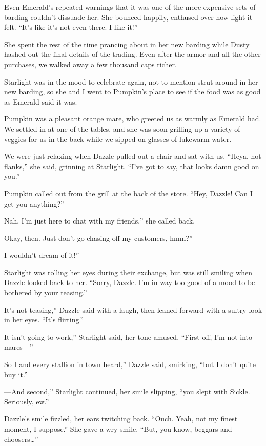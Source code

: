 Even Emerald’s repeated warnings that it was one of the more expensive sets of barding couldn’t dissuade her. She bounced happily, enthused over how light it felt. “It’s like it’s not even there. I like it!”

She spent the rest of the time prancing about in her new barding while Dusty hashed out the final details of the trading. Even after the armor and all the other purchases, we walked away a few thousand caps richer.

Starlight was in the mood to celebrate again, not to mention strut around in her new barding, so she and I went to Pumpkin’s place to see if the food was as good as Emerald said it was.

Pumpkin was a pleasant orange mare, who greeted us as warmly as Emerald had. We settled in at one of the tables, and she was soon grilling up a variety of veggies for us in the back while we sipped on glasses of lukewarm water.

We were just relaxing when Dazzle pulled out a chair and sat with us. “Heya, hot flanks,” she said, grinning at Starlight. “I’ve got to say, that looks damn good on you.”

Pumpkin called out from the grill at the back of the store. “Hey, Dazzle! Can I get you anything?”

\leavevmode{}Nah, I’m just here to chat with my friends,” she called back.

\leavevmode{}Okay, then. Just don’t go chasing off my customers, hmm?”

\leavevmode{}I wouldn’t dream of it!”

Starlight was rolling her eyes during their exchange, but was still smiling when Dazzle looked back to her. “Sorry, Dazzle. I’m in way too good of a mood to be bothered by your teasing.”

\leavevmode{}It’s not teasing,” Dazzle said with a laugh, then leaned forward with a sultry look in her eyes. “It’s flirting.”

\leavevmode{}It isn’t going to work,” Starlight said, her tone amused. “First off, I’m not into mares—”

\leavevmode{}So I and every stallion in town heard,” Dazzle said, smirking, “but I don’t quite buy it.”

\leavevmode{}—And second,” Starlight continued, her smile slipping, “you slept with Sickle. Seriously, ew.”

Dazzle’s smile fizzled, her ears twitching back. “Ouch. Yeah, not my finest moment, I suppose.” She gave a wry smile. “But, you know, beggars and choosers…”

